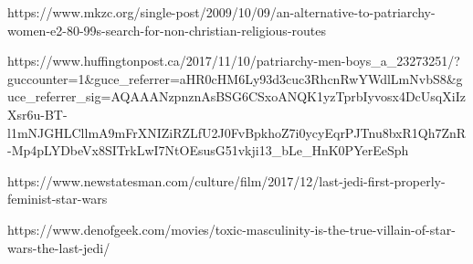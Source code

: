 https://www.mkzc.org/single-post/2009/10/09/an-alternative-to-patriarchy-women-e2-80-99s-search-for-non-christian-religious-routes


https://www.huffingtonpost.ca/2017/11/10/patriarchy-men-boys_a_23273251/?guccounter=1&guce_referrer=aHR0cHM6Ly93d3cuc3RhcnRwYWdlLmNvbS8&guce_referrer_sig=AQAAANzpnznAsBSG6CSxoANQK1yzTprbIyvosx4DcUsqXiIzXsr6u-BT-l1mNJGHLCllmA9mFrXNIZiRZLfU2J0FvBpkhoZ7i0ycyEqrPJTnu8bxR1Qh7ZnR-Mp4pLYDbeVx8SITrkLwI7NtOEsusG51vkji13_bLe_HnK0PYerEeSph

https://www.newstatesman.com/culture/film/2017/12/last-jedi-first-properly-feminist-star-wars

https://www.denofgeek.com/movies/toxic-masculinity-is-the-true-villain-of-star-wars-the-last-jedi/
